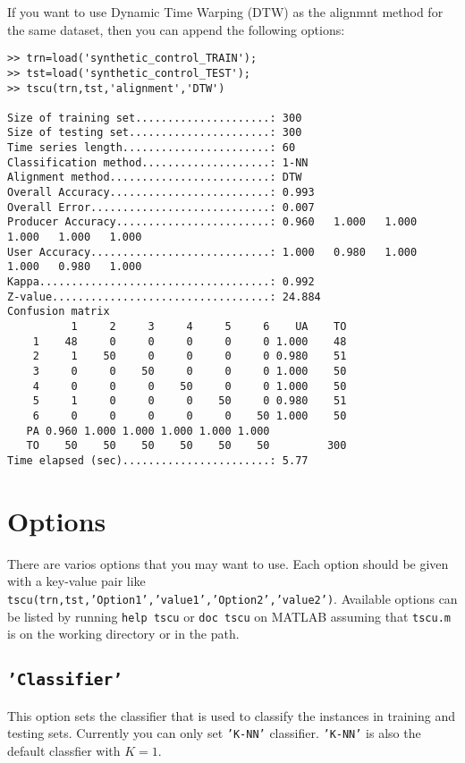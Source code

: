 \documentclass{article}
\begin{document}
If you want to use Dynamic Time Warping (DTW) as the alignmnt method for the same dataset, then you can append the following options:
\begin{scriptsize}
\begin{verbatim}
>> trn=load('synthetic_control_TRAIN');
>> tst=load('synthetic_control_TEST');
>> tscu(trn,tst,'alignment','DTW')

Size of training set.....................: 300
Size of testing set......................: 300
Time series length.......................: 60
Classification method....................: 1-NN
Alignment method.........................: DTW
Overall Accuracy.........................: 0.993   
Overall Error............................: 0.007   
Producer Accuracy........................: 0.960   1.000   1.000   1.000   1.000   1.000   
User Accuracy............................: 1.000   0.980   1.000   1.000   0.980   1.000   
Kappa....................................: 0.992   
Z-value..................................: 24.884  
Confusion matrix
          1     2     3     4     5     6    UA    TO 
    1    48     0     0     0     0     0 1.000    48 
    2     1    50     0     0     0     0 0.980    51 
    3     0     0    50     0     0     0 1.000    50 
    4     0     0     0    50     0     0 1.000    50 
    5     1     0     0     0    50     0 0.980    51 
    6     0     0     0     0     0    50 1.000    50 
   PA 0.960 1.000 1.000 1.000 1.000 1.000 
   TO    50    50    50    50    50    50         300 
Time elapsed (sec).......................: 5.77  
\end{verbatim}
\end{scriptsize}

\section{Options}
There are varios options that you may want to use. Each option should be given with a key-value pair like \texttt{tscu(trn,tst,'Option1','value1','Option2','value2')}. Available options can be listed by running \texttt{help tscu} or \texttt{doc tscu} on MATLAB assuming that \texttt{tscu.m} is on the working directory or in the path.

\subsection{\texttt{'Classifier'}}
This option sets the classifier that is used to classify the instances in training and testing sets. Currently you can only set \texttt{'K-NN'} classifier. \texttt{'K-NN'} is also the default classfier with $K=1$.
\end{document}
